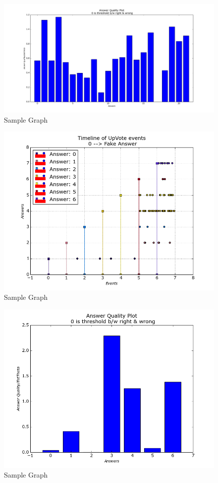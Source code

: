 \documentclass{article}
\begin{document}
\begin{figure}[H]
\centering
\includegraphics[width=12cm]{results_ver2/longVote_SOL.png}
\caption{Sample Graph}
\label{fig1:overview}
\end{figure}
\begin{figure}[H]
\centering
\includegraphics[width=12cm]{results_ver2/timeWeightTL.png}
\caption{Sample Graph}
\label{fig1:overview}
\end{figure}
\begin{figure}[H]
\centering
\includegraphics[width=12cm]{results_ver2/timeWeightSol.png}
\caption{Sample Graph}
\label{fig1:overview}
\end{figure}
\end{document}
